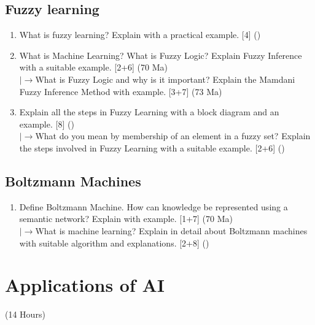 \documentclass[12pt]{article}
\newcommand{\lb}{\\$\left|\rightarrow\right.$}
\begin{document}
  \subsection{Fuzzy learning}
    \begin{enumerate}[topsep=0pt, noitemsep]
      \item What is fuzzy learning? Explain with a practical example. \hfill [4] ()

      \item What is Machine Learning? What is Fuzzy Logic? Explain Fuzzy Inference with a suitable example. \hfill [2+6] (70 Ma)
        \lb What is Fuzzy Logic and why is it important? Explain the Mamdani Fuzzy Inference Method with example. \hfill [3+7] (73 Ma)

      \item Explain all the steps in Fuzzy Learning with a block diagram and an example. \hfill [8] ()
        \lb What do you mean by membership of an element in a fuzzy set? Explain the steps involved in Fuzzy Learning with a suitable example. \hfill [2+6] ()
    \end{enumerate}

  \subsection{Boltzmann Machines}
    \begin{enumerate}[topsep=0pt, noitemsep]
      \item Define Boltzmann Machine. How can knowledge be represented using a semantic network? Explain with example. \hfill [1+7] (70 Ma)
        \lb What is machine learning? Explain in detail about Boltzmann machines with suitable algorithm and explanations. \hfill [2+8] ()
    \end{enumerate}

\pagebreak
\section{Applications of AI}
\begin{center}(14 Hours)\end{center}
\end{document}
